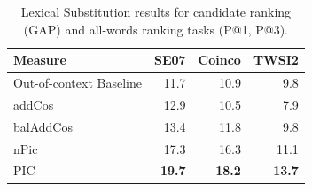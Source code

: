 \documentclass[12pt]{article}
\begin{document}
\begin{table}
\begin{center}
\begin{tabular}{|l|r|r|r|}
  \hline
  {\bf Measure} & {\bf SE07} & {\bf Coinco} & {\bf TWSI2}\\
  \hline\hline
  Out-of-context Baseline                  &     11.7   &    10.9   &      9.8       \\
  addCos                                   &     12.9   &    10.5   &      7.9       \\
  balAddCos                                &     13.4   &    11.8   &      9.8       \\
  \hline
  nPic                                     &     17.3   &    16.3   &     11.1       \\
  PIC                                      & {\bf19.7}  &{\bf18.2}  & {\bf13.7}      \\
  \hline
\end{tabular}
\end{center}
\caption{Lexical Substitution results for candidate ranking (GAP) and all-words
ranking tasks (P@1, P@3).}
\label{tab:precision}
\end{table}
\end{document}
